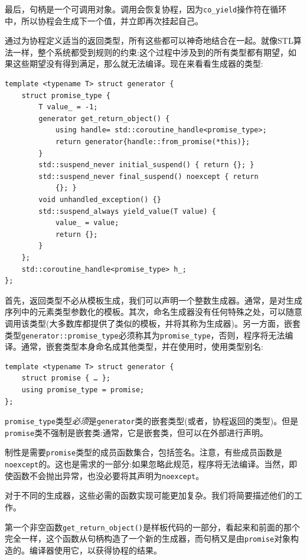 最后，句柄是一个可调用对象。调用会恢复协程，因为\texttt{co\_yield}操作符在循环中，所以协程会生成下一个值，并立即再次挂起自己。 

通过为协程定义适当的返回类型，所有这些都可以神奇地结合在一起。就像STL算法一样，整个系统都受到规则的约束:这个过程中涉及到的所有类型都有期望，如果这些期望没有得到满足，那么就无法编译。现在来看看生成器的类型:

\begin{lstlisting}[style=styleCXX]
template <typename T> struct generator {
	struct promise_type {
		T value_ = -1;
		generator get_return_object() {
			using handle= std::coroutine_handle<promise_type>;
			return generator{handle::from_promise(*this)};
		}
		std::suspend_never initial_suspend() { return {}; }
		std::suspend_never final_suspend() noexcept { return 
			{}; }
		void unhandled_exception() {}
		std::suspend_always yield_value(T value) {
			value_ = value;
			return {};
		}
	};
	std::coroutine_handle<promise_type> h_;
};
\end{lstlisting}

首先，返回类型不必从模板生成，我们可以声明一个整数生成器。通常，是对生成序列中的元素类型参数化的模板。其次，命名生成器没有任何特殊之处，可以随意调用该类型(大多数库都提供了类似的模板，并将其称为生成器)。另一方面，嵌套类型\texttt{generator::promise\_type}必须称其为\texttt{promise\_type}，否则，程序将无法编译。通常，嵌套类型本身命名成其他类型，并在使用时，使用类型别名:

\begin{lstlisting}[style=styleCXX]
template <typename T> struct generator {
	struct promise { … };
	using promise_type = promise;
};
\end{lstlisting}

\texttt{promise\_type}类型\textit{必须}是\texttt{generator}类的嵌套类型(或者，协程返回的类型)。但是\texttt{promise}类不强制是嵌套类:通常，它是嵌套类，但可以在外部进行声明。 

制性是需要\texttt{promise}类型的成员函数集合，包括签名。注意，有些成员函数是\texttt{noexcept}的。这也是需求的一部分:如果忽略此规范，程序将无法编译。当然，即使函数不会抛出异常，也没必要将其声明为\texttt{noexcept}。 

对于不同的生成器，这些必需的函数实现可能更加复杂。我们将简要描述他们的工作。

第一个非空函数\texttt{get\_return\_object()}是样板代码的一部分，看起来和前面的那个完全一样，这个函数从句柄构造了一个新的生成器，而句柄又是由\texttt{promise}对象构造的。编译器使用它，以获得协程的结果。 

